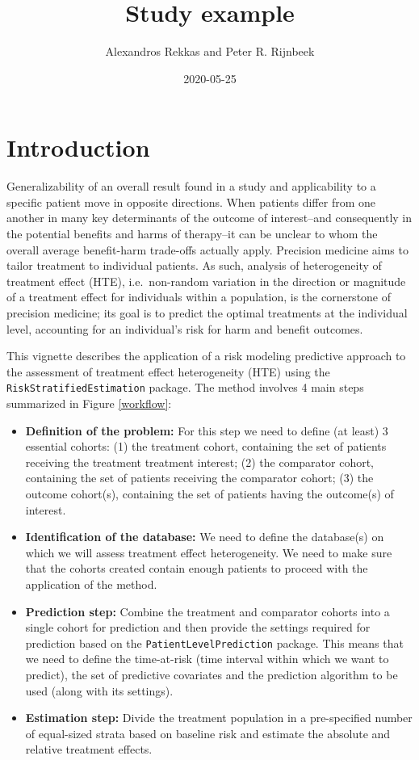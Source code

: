 \documentclass[]{article}
\title{Study example}
\author{Alexandros Rekkas and Peter R. Rijnbeek}
\date{2020-05-25}
\providecommand{\tightlist}{%
  \setlength{\itemsep}{0pt}\setlength{\parskip}{0pt}}
\begin{document}
\maketitle

{
\setcounter{tocdepth}{2}
\tableofcontents
}
\hypertarget{introduction}{%
\section{Introduction}\label{introduction}}

Generalizability of an overall result found in a study and applicability
to a specific patient move in opposite directions. When patients differ
from one another in many key determinants of the outcome of
interest--and consequently in the potential benefits and harms of
therapy--it can be unclear to whom the overall average benefit-harm
trade-offs actually apply. Precision medicine aims to tailor treatment
to individual patients. As such, analysis of heterogeneity of treatment
effect (HTE), i.e.~non-random variation in the direction or magnitude of
a treatment effect for individuals within a population, is the
cornerstone of precision medicine; its goal is to predict the optimal
treatments at the individual level, accounting for an individual's risk
for harm and benefit outcomes.

This vignette describes the application of a risk modeling predictive
approach to the assessment of treatment effect heterogeneity (HTE) using
the \texttt{RiskStratifiedEstimation} package. The method involves 4
main steps summarized in Figure \ref{workflow}:

\begin{itemize}
\tightlist
\item
  \textbf{Definition of the problem:} For this step we need to define
  (at least) 3 essential cohorts: (1) the treatment cohort, containing
  the set of patients receiving the treatment treatment interest; (2)
  the comparator cohort, containing the set of patients receiving the
  comparator cohort; (3) the outcome cohort(s), containing the set of
  patients having the outcome(s) of interest.
\item
  \textbf{Identification of the database:} We need to define the
  database(s) on which we will assess treatment effect heterogeneity. We
  need to make sure that the cohorts created contain enough patients to
  proceed with the application of the method.
\item
  \textbf{Prediction step:} Combine the treatment and comparator cohorts
  into a single cohort for prediction and then provide the settings
  required for prediction based on the \texttt{PatientLevelPrediction}
  package. This means that we need to define the time-at-risk (time
  interval within which we want to predict), the set of predictive
  covariates and the prediction algorithm to be used (along with its
  settings).
\item
  \textbf{Estimation step:} Divide the treatment population in a
  pre-specified number of equal-sized strata based on baseline risk and
  estimate the absolute and relative treatment effects.
\end{itemize}
\end{document}
